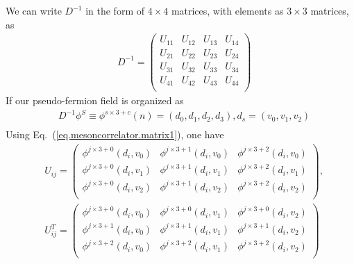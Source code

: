 We can write $D^{-1}$ in the form of $4\times 4$ matrices, with elements as $3\times 3$ matrices, as
\begin{equation}
\begin{split}
&D^{-1}=\left(\begin{array}{cccc}
U_{11} & U_{12} & U_{13} & U_{14} \\
U_{21} & U_{22} & U_{23} & U_{24} \\
U_{31} & U_{32} & U_{33} & U_{34} \\
U_{41} & U_{42} & U_{43} & U_{44} \\
\end{array}\right)
\end{split}
\end{equation}
If our pseudo-fermion field is organized as
\begin{equation}
\begin{split}
&D^{-1}\phi^S\equiv \phi ^{s\times 3+c}(n)=\left(d_0,d_1,d_2,d_3\right), d_s=\left(v_0,v_1,v_2\right)\\
\end{split}
\end{equation}
Using Eq.~(\ref{eq.mesoncorrelator.matrix1}), one have
\begin{equation}
\begin{split}
&U_{ij}=\left(\begin{array}{ccc}
\phi ^{j\times 3 + 0} (d_i,v_0) & \phi ^{j\times 3 + 1}(d_i,v_0) & \phi ^{j\times 3 + 2}(d_i,v_0)  \\
\phi ^{j\times 3 + 0} (d_i,v_1) & \phi ^{j\times 3 + 1}(d_i,v_1) & \phi ^{j\times 3 + 2}(d_i,v_1)  \\
\phi ^{j\times 3 + 0} (d_i,v_2) & \phi ^{j\times 3 + 1}(d_i,v_2) & \phi ^{j\times 3 + 2}(d_i,v_2)  \\
\end{array}\right),\\
&U_{ij}^T=\left(\begin{array}{ccc}
\phi ^{j\times 3 + 0} (d_i,v_0) & \phi ^{j\times 3 + 0}(d_i,v_1) & \phi ^{j\times 3 + 0}(d_i,v_2)  \\
\phi ^{j\times 3 + 1} (d_i,v_0) & \phi ^{j\times 3 + 1}(d_i,v_1) & \phi ^{j\times 3 + 1}(d_i,v_2)  \\
\phi ^{j\times 3 + 2} (d_i,v_0) & \phi ^{j\times 3 + 2}(d_i,v_1) & \phi ^{j\times 3 + 2}(d_i,v_2)  \\
\end{array}\right)\\
\end{split}
\end{equation}
